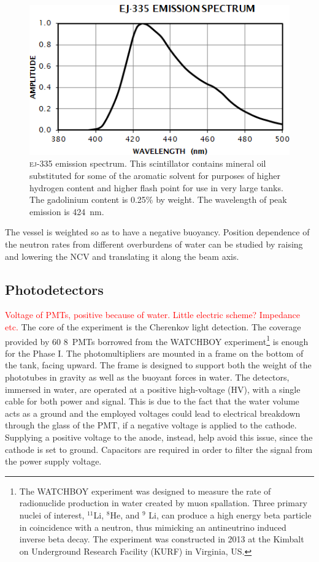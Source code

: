  \begin{figure}[]
   \centering
   \includegraphics[scale=0.60]{pics/ej335}
   \caption{\textsc{ej-335} emission spectrum. This scintillator contains mineral oil %
 substituted for some of the aromatic solvent for purposes of higher hydrogen content %
 and higher flash point for use in very large tanks. The gadolinium content is 0.25\% by weight.
 The wavelength of peak emission is 424~nm.}
   \label{fig:ej335}
 \end{figure}

 The vessel is weighted so as to have a negative buoyancy.
 Position dependence of the neutron rates from different overburdens of water can be %
 studied by raising and lowering the NCV and translating it along the beam axis.

\subsection{Photodetectors}
\textcolor{red}{Voltage of PMTs, positive because of water. Little electric scheme? Impedance etc.}
 The core of the experiment is the Cherenkov light detection.
 The coverage provided by 60 8\inch~PMTs borrowed from the WATCHBOY experiment\footnote{The %
   WATCHBOY experiment was designed to measure the rate of radionuclide production in water %
   created by muon spallation. Three primary nuclei of interest, $^{11}$Li, $^8$He, and %
   $^9$ Li, can produce a high energy beta particle in coincidence with a neutron, thus mimicking %
   an antineutrino induced inverse beta decay. The experiment was constructed in 2013 at the %
   Kimbalt on Underground Research Facility (KURF) in Virginia, US.} is enough %
   for the Phase I.
 The photomultipliers are mounted in a frame on the bottom of the tank, facing upward.
 The frame is designed to support both the weight of the phototubes in gravity as well as the %
 buoyant forces in water. 
 The detectors, immersed in water, are operated at a positive high-voltage (HV), with a single %
 cable for both power and signal.
 This is due to the fact that the water volume acts as a ground and the employed voltages could lead to electrical %
 breakdown through the glass of the PMT, if a negative voltage is applied to the cathode.
 Supplying a positive voltage to the anode, instead, help avoid this issue, since the cathode is set to ground.
 Capacitors are required in order to filter the signal from the power supply voltage.

